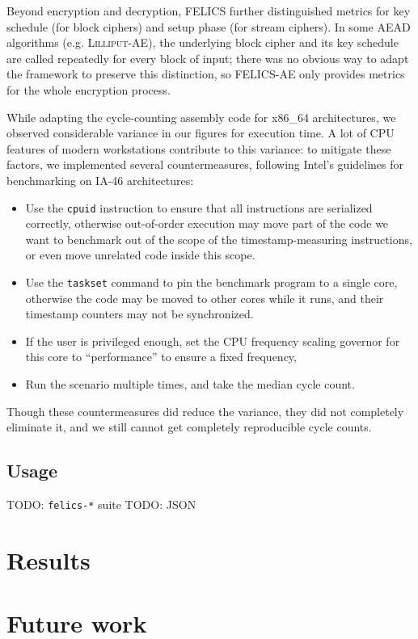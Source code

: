 \documentclass{article}
\begin{document}
Beyond encryption and decryption, FELICS further distinguished metrics
for key schedule (for block ciphers) and setup phase (for stream
ciphers).  In some AEAD algorithms (e.g. \textsc{Lilliput-AE}), the
underlying block cipher and its key schedule are called repeatedly for
every block of input; there was no obvious way to adapt the framework
to preserve this distinction, so FELICS-AE only provides metrics for
the whole encryption process.

While adapting the cycle-counting assembly code for x86\_64
architectures, we observed considerable variance in our figures for
execution time.  A lot of CPU features of modern workstations
contribute to this variance: to mitigate these factors, we implemented
several countermeasures, following Intel's guidelines for benchmarking
on IA-46 architectures\cite{Intel:64bit-ISA-bench}:

\begin{itemize}
\item Use the \texttt{cpuid} instruction to ensure that all
  instructions are serialized correctly, otherwise out-of-order
  execution may move part of the code we want to benchmark out of the
  scope of the timestamp-measuring instructions, or even move
  unrelated code inside this scope.

\item Use the \texttt{taskset} command to pin the benchmark program to
  a single core, otherwise the code may be moved to other cores while
  it runs, and their timestamp counters may not be synchronized.

\item If the user is privileged enough, set the CPU frequency scaling
  governor for this core to ``performance'' to ensure a fixed
  frequency,

\item Run the scenario multiple times, and take the median cycle count.
\end{itemize}

Though these countermeasures did reduce the variance, they did not
completely eliminate it, and we still cannot get completely
reproducible cycle counts.

\subsection{Usage}
\label{sec:felics-ae/usage}

TODO: \texttt{felics-*} suite
TODO: JSON

\section{Results}
\label{sec:results}

\section{Future work}
\label{sec:future}



\end{document}
